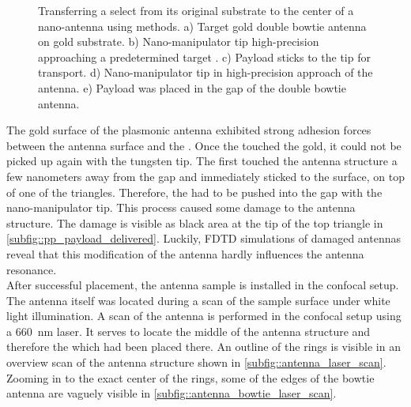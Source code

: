 \begin{figure}[htp]
\begin{subfigure}[t]{ 0.49\linewidth}
					\caption{}
					\label{subfig::pp_payload_delivered}
				\end{subfigure}
				\caption[Pick-and-place coupling of \nd to antenna]{Transferring a select \nd from its original substrate to the center of a nano-antenna using \pp methods. a) Target gold double bowtie antenna on gold substrate. b) Nano-manipulator tip high-precision approaching a predetermined target \nd. c) Payload \nd sticks to the tip for transport. d) Nano-manipulator tip in high-precision approach of the antenna. e) Payload \nd was placed in the gap of the double bowtie antenna.}
				\label{fig::pp_antenna}
			\end{figure}

			The gold surface of the plasmonic antenna exhibited strong adhesion forces between the antenna surface and the \nd.
			Once the \nd touched the gold, it could not be picked up again with the tungsten tip.
			The \nd first touched the antenna structure a few nanometers away from the gap and immediately sticked to the surface, on top of one of the triangles.
			Therefore, the \nd had to be pushed into the gap with the nano-manipulator tip.
			This process caused some damage to the antenna structure.
			The damage is visible as black area at the tip of the top triangle in \autoref{subfig::pp_payload_delivered}.
			Luckily, FDTD simulations of damaged antennas reveal that this modification of the antenna hardly influences the antenna resonance.
			\\
			After successful placement, the antenna sample is installed in the confocal setup.
			The antenna itself was located during a scan of the sample surface under white light illumination.
			A scan of the antenna is performed in the confocal setup using a \SI{660}{nm} \cw laser.
			It serves to locate the middle of the antenna structure and therefore the \nd which had been placed there.
			An outline of the rings is visible in an overview scan of the antenna structure shown in \autoref{subfig::antenna_laser_scan}.
			Zooming in to the exact center of the rings, some of the edges of the bowtie antenna are vaguely visible in \autoref{subfig::antenna_bowtie_laser_scan}.

